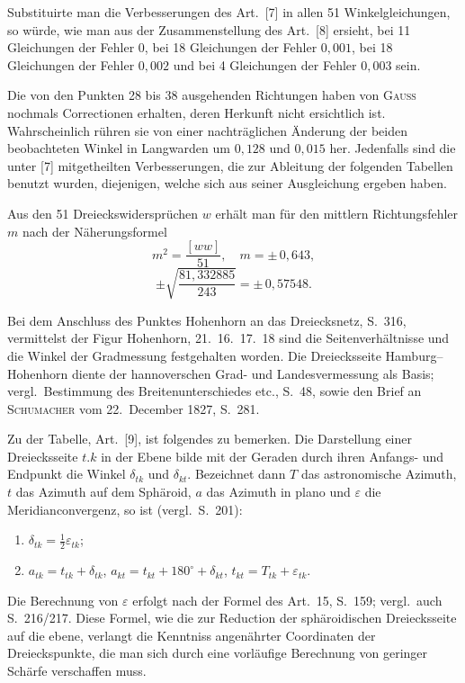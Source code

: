 \documentclass[12pt,a4paper]{article}
\theoremstyle{plain}
\theoremstyle{definition}
\theoremstyle{remark}
\begin{document}
Substituirte man die Verbesserungen des Art.\ [7] in allen 51 Winkelgleichungen, so w\"urde, wie man aus der Zusammenstellung des Art.\ [8] ersieht, bei 11 Gleichungen der Fehler $0$, bei 18 Gleichungen der Fehler $0{,}001$, bei 18 Gleichungen der Fehler $0{,}002$ und bei 4 Gleichungen der Fehler $0{,}003$ sein.

Die von den Punkten 28 bis 38 ausgehenden Richtungen haben von \textsc{Gauss} nochmals Correctionen erhalten, deren Herkunft nicht ersichtlich ist. Wahrscheinlich r\"uhren sie von einer nachtr\"aglichen \"Anderung der beiden beobachteten Winkel in Langwarden um $0{,}128$ und $0{,}015$ her. Jedenfalls sind die unter [7] mitgetheilten Verbesserungen, die zur Ableitung der folgenden Tabellen benutzt wurden, diejenigen, welche sich aus seiner Ausgleichung ergeben haben.

Aus den 51 Dreieckswiderspr\"uchen $w$ erh\"alt man f\"ur den mittlern Richtungsfehler $m$ nach der N\"aherungsformel
\[m^2 = \frac{[ww]}{51}, \quad m = \pm\,0{,}643,\]
\[\pm\sqrt{\frac{81{,}332885}{243}} = \pm\,0{,}57548.\]

Bei dem Anschluss des Punktes Hohenhorn an das Dreiecksnetz, S.\ 316, vermittelst der Figur Hohenhorn, 21.\ 16.\ 17.\ 18 sind die Seitenverh\"altnisse und die Winkel der Gradmessung festgehalten worden. Die Dreiecksseite Hamburg--Hohenhorn diente der hannoverschen Grad- und Landesvermessung als Basis; vergl.\ Bestimmung des Breitenunterschiedes etc., S.\ 48, sowie den Brief an \textsc{Schumacher} vom 22.\ December 1827, S.\ 281.

Zu der Tabelle, Art.\ [9], ist folgendes zu bemerken. Die Darstellung einer Dreiecksseite $t.k$ in der Ebene bilde mit der Geraden durch ihren Anfangs- und Endpunkt die Winkel $\delta_{tk}$ und $\delta_{kt}$. Bezeichnet dann $T$ das astronomische Azimuth, $t$ das Azimuth auf dem Sph\"aroid, $a$ das Azimuth in plano und $\varepsilon$ die Meridianconvergenz, so ist (vergl.\ S.\ 201):
\begin{enumerate}
\item[$1)$] $\delta_{tk} = \frac{1}{2}\varepsilon_{tk}$;
\item[$2)$] $a_{tk} = t_{tk} + \delta_{tk}$, $a_{kt} = t_{kt} + 180^{\circ} + \delta_{kt}$, $t_{kt} = T_{tk} + \varepsilon_{tk}$.
\end{enumerate}
Die Berechnung von $\varepsilon$ erfolgt nach der Formel des Art.\ 15, S.\ 159; vergl.\ auch S.\ 216/217. Diese Formel, wie die zur Reduction der sph\"aroidischen Dreiecksseite auf die ebene, verlangt die Kenntniss angen\"ahrter Coordinaten der Dreieckspunkte, die man sich durch eine vorl\"aufige Berechnung von geringer Sch\"arfe verschaffen muss.
\end{document}
